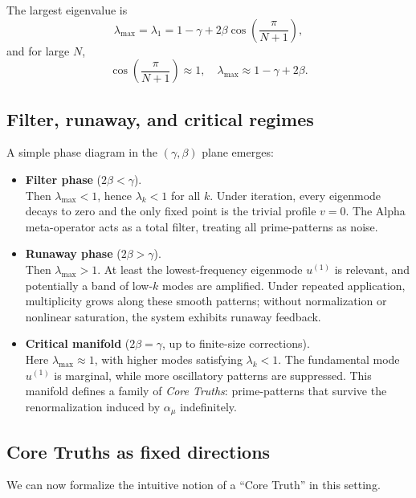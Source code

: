 \documentclass[11pt]{article}
\begin{document}
The largest eigenvalue is
\begin{equation}
\lambda_{\max} = \lambda_1 = 1 - \gamma + 2\beta \cos\left(\frac{\pi}{N+1}\right),
\end{equation}
and for large \(N\),
\begin{equation}
\cos\left(\frac{\pi}{N+1}\right) \approx 1,\quad \lambda_{\max} \approx 1 - \gamma + 2\beta.
\end{equation}

\subsection{Filter, runaway, and critical regimes}

A simple phase diagram in the \((\gamma,\beta)\) plane emerges:

\begin{itemize}
  \item \textbf{Filter phase} (\(2\beta < \gamma\)).\\
  Then \(\lambda_{\max} < 1\), hence \(\lambda_k < 1\) for all \(k\). Under iteration, every eigenmode decays to zero and the only fixed point is the trivial profile \(v = 0\). The Alpha meta-operator acts as a total filter, treating all prime-patterns as noise.
  \item \textbf{Runaway phase} (\(2\beta > \gamma\)).\\
  Then \(\lambda_{\max} > 1\). At least the lowest-frequency eigenmode \(u^{(1)}\) is relevant, and potentially a band of low-\(k\) modes are amplified. Under repeated application, multiplicity grows along these smooth patterns; without normalization or nonlinear saturation, the system exhibits runaway feedback.
  \item \textbf{Critical manifold} (\(2\beta = \gamma\), up to finite-size corrections).\\
  Here \(\lambda_{\max} \approx 1\), with higher modes satisfying \(\lambda_k < 1\). The fundamental mode \(u^{(1)}\) is marginal, while more oscillatory patterns are suppressed. This manifold defines a family of \emph{Core Truths}: prime-patterns that survive the renormalization induced by \(\alpha_\mu\) indefinitely.
\end{itemize}

\subsection{Core Truths as fixed directions}

We can now formalize the intuitive notion of a ``Core Truth'' in this setting.
\end{document}
